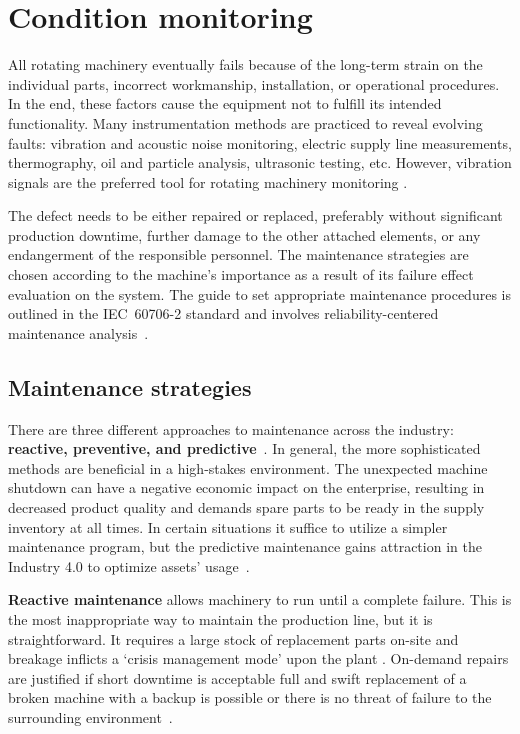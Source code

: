 \section{Condition monitoring}
All rotating machinery eventually fails because of the long-term strain on the individual parts, incorrect workmanship, installation, or operational procedures. In the end, these factors cause the equipment not to fulfill its intended functionality. Many instrumentation methods are practiced to reveal evolving faults: vibration and acoustic noise monitoring, electric supply line measurements, thermography, oil and particle analysis, ultrasonic testing, etc. However, vibration signals are the preferred tool for rotating machinery monitoring \cite{mohanty_machinery_2015}.

The defect needs to be either repaired or replaced, preferably without significant production downtime, further damage to the other attached elements, or any endangerment of the responsible personnel. The maintenance strategies are chosen according to the machine's importance as a result of its failure effect evaluation on the system. The guide to set appropriate maintenance procedures is outlined in the IEC~60706-2 standard and involves reliability-centered maintenance analysis~\cite{el-thalji_predictive_2019}.

\subsection{Maintenance strategies}
There are three different approaches to maintenance across the industry: \textbf{reactive, preventive, and predictive}~\cite{scheffer_practical_2004}. In general, the more sophisticated methods are beneficial in a high-stakes environment. The unexpected machine shutdown can have a negative economic impact on the enterprise, resulting in decreased product quality and demands spare parts to be ready in the supply inventory at all times. In certain situations it suffice to utilize a simpler maintenance program, but the predictive maintenance gains attraction in the Industry 4.0 to optimize assets' usage~\cite{cinar_machine_2020}.
\bigbreak

\textbf{Reactive maintenance} allows machinery to run until a complete failure. This is the most inappropriate way to maintain the production line, but it is straightforward. It requires a large stock of replacement parts on-site and breakage inflicts a `crisis management mode' upon the plant \cite{scheffer_practical_2004}. On-demand repairs are justified if short downtime is acceptable full and swift replacement of a broken machine with a backup is possible or there is no threat of failure to the surrounding environment~\cite{ziaran_technicka_2013}.
\bigbreak

